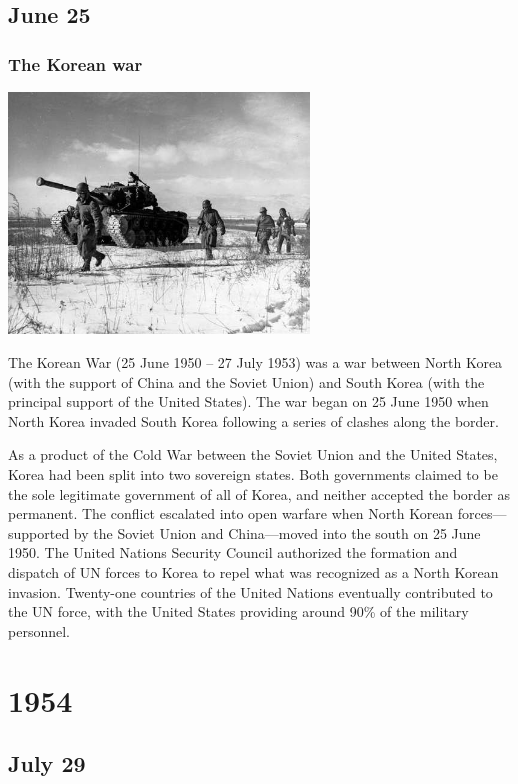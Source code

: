 \documentclass[11pt]{report}
\begin{document}
\section{June 25}
\subsection{The Korean war}
\vspace{2mm}\begin{center}\includegraphics[width=8cm]{./img/koreanWar.jpg}\end{center}
The Korean War (25 June 1950 – 27 July 1953) was a war between North Korea (with the support of China and the Soviet Union) and South Korea (with the principal support of the United States). The war began on 25 June 1950 when North Korea invaded South Korea following a series of clashes along the border.

As a product of the Cold War between the Soviet Union and the United States, Korea had been split into two sovereign states. Both governments claimed to be the sole legitimate government of all of Korea, and neither accepted the border as permanent. The conflict escalated into open warfare when North Korean forces—supported by the Soviet Union and China—moved into the south on 25 June 1950. The United Nations Security Council authorized the formation and dispatch of UN forces to Korea to repel what was recognized as a North Korean invasion. Twenty-one countries of the United Nations eventually contributed to the UN force, with the United States providing around 90\% of the military personnel.

\chapter{1954}
\section{July 29}
\end{document}
